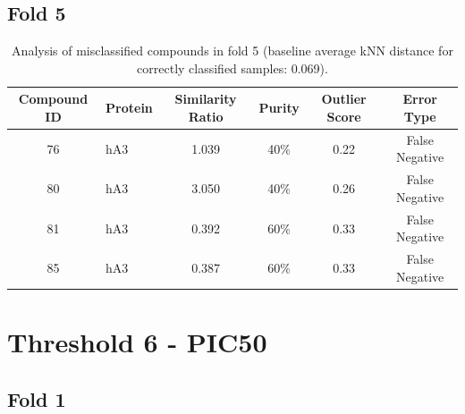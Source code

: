 \documentclass{article}
\newenvironment{smarttabular}[1]{%
    \begin{tabular}{#1}%
}{%
    \end{tabular}%
}
\begin{document}
\clearpage

\subsection{Fold 5}

\begin{table}[H]
    \centering
    \small
    \caption{Analysis of misclassified compounds in fold 5 (baseline average kNN distance for correctly classified samples: 0.069).}
    \label{tab:misclassified_compounds_5}
    \begin{smarttabular}{clcccc}
        \toprule
        \textbf{Compound ID} & \textbf{Protein} & \textbf{Similarity Ratio} & \textbf{Purity} & \textbf{Outlier Score} & \textbf{Error Type} \\
        \midrule
        76 & hA3 & 1.039 & 40\% & 0.22 & False Negative \\
        80 & hA3 & 3.050 & 40\% & 0.26 & False Negative \\
        81 & hA3 & 0.392 & 60\% & 0.33 & False Negative \\
        85 & hA3 & 0.387 & 60\% & 0.33 & False Negative \\
        \bottomrule
    \end{smarttabular}
\end{table}

\clearpage

\section{Threshold 6 - PIC50}

\subsection{Fold 1}
\end{document}
